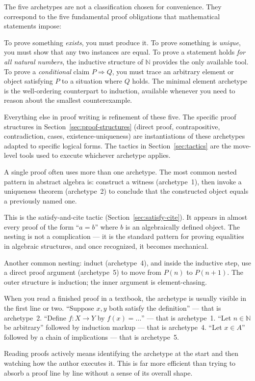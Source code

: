 \begin{remark}
The five archetypes are not a classification chosen for convenience.
They correspond to the five fundamental proof obligations that
mathematical statements impose:

To prove something \emph{exists}, you must produce it. To prove something
is \emph{unique}, you must show that any two instances are equal.
To prove a statement holds \emph{for all natural numbers}, the inductive
structure of $\mathbb{N}$ provides the only available tool. To prove a
\emph{conditional} claim $P \Rightarrow Q$, you must trace an arbitrary
element or object satisfying $P$ to a situation where $Q$ holds.
The minimal element archetype is the well-ordering counterpart to
induction, available whenever you need to reason about the smallest
counterexample.

Everything else in proof writing is refinement of these five. The specific
proof structures in Section~\ref{sec:proof-structures} (direct proof,
contrapositive, contradiction, cases, existence-uniqueness) are
instantiations of these archetypes adapted to specific logical forms.
The tactics in Section~\ref{sec:tactics} are the move-level tools
used to execute whichever archetype applies.
\end{remark}

\begin{remark}
A single proof often uses more than one archetype. The most common
nested pattern in abstract algebra is: construct a witness (archetype~1),
then invoke a uniqueness theorem (archetype~2) to conclude that the
constructed object equals a previously named one.

This is the satisfy-and-cite tactic (Section~\ref{sec:satisfy-cite}).
It appears in almost every proof of the form ``$a = b$'' where $b$ is
an algebraically defined object. The nesting is not a complication ---
it is the standard pattern for proving equalities in algebraic structures,
and once recognized, it becomes mechanical.

Another common nesting: induct (archetype~4), and inside the inductive
step, use a direct proof argument (archetype~5) to move from $P(n)$ to
$P(n+1)$. The outer structure is induction; the inner argument is
element-chasing.
\end{remark}

\begin{remark}
When you read a finished proof in a textbook, the archetype is usually
visible in the first line or two. ``Suppose $x, y$ both satisfy the
definition'' --- that is archetype~2. ``Define $f : X \to Y$ by
$f(x) = \ldots$'' --- that is archetype~1. ``Let $n \in \mathbb{N}$ be
arbitrary'' followed by induction markup --- that is archetype~4.
``Let $x \in A$'' followed by a chain of implications --- that is
archetype~5.

Reading proofs actively means identifying the archetype at the start
and then watching how the author executes it. This is far more efficient
than trying to absorb a proof line by line without a sense of its
overall shape.
\end{remark}

